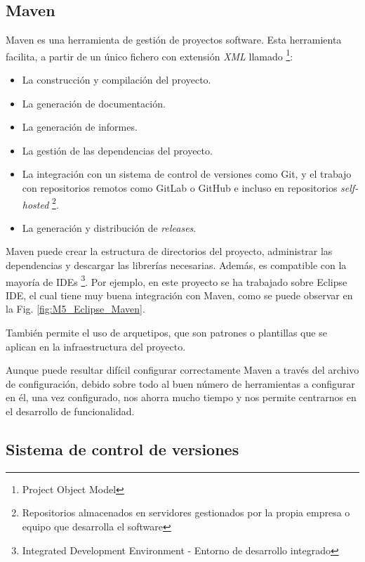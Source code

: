 \subsection{Maven}

Maven es una herramienta de gestión de proyectos software. Esta herramienta facilita, a partir de un único fichero con extensión \textit{XML} llamado  \footnote{Project Object Model}:
\begin{itemize}
	\tightlist
	\item La construcción y compilación del proyecto.
	\item La generación de documentación.
	\item La generación de informes.
	\item La gestión de las dependencias del proyecto.
	\item La integración con un sistema de control de versiones como Git, y el trabajo con repositorios remotos como GitLab o GitHub e incluso en repositorios \textit{self-hosted} \footnote{Repositorios almacenados en servidores gestionados por la propia empresa o equipo que desarrolla el software}.
	\item La generación y distribución de \textit{releases}.
\end{itemize}
Maven puede crear la estructura de directorios del proyecto, administrar las dependencias y descargar las librerías necesarias. Además, es compatible con la mayoría de IDEs \footnote{Integrated Development Environment - Entorno de desarrollo integrado}. Por ejemplo, en este proyecto se ha trabajado sobre Eclipse IDE, el cual tiene muy buena integración con Maven, como se puede observar en la Fig. \ref{fig:M5_Eclipse_Maven}.


También permite el uso de arquetipos, que son patrones o plantillas que se aplican en la infraestructura del proyecto.

Aunque puede resultar difícil configurar correctamente Maven a través del archivo de configuración, debido sobre todo al buen número de herramientas a configurar en él, una vez configurado, nos ahorra mucho tiempo y nos permite centrarnos en el desarrollo de funcionalidad.

\subsection{Sistema de control de versiones}

